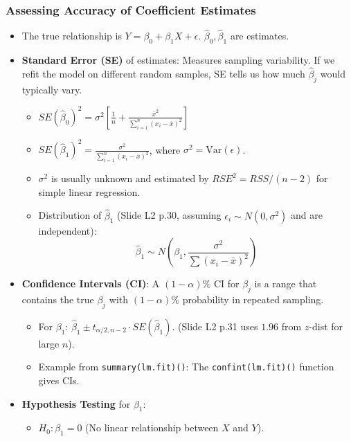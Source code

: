 \documentclass[12pt,a4paper]{article}
\newcommand{\Rfunction}[1]{\texttt{#1()}} %
\begin{document}
\begin{itemize}
    \subsubsection{Assessing Accuracy of Coefficient Estimates }
        \begin{itemize}
            \item The true relationship is $Y = \beta_0 + \beta_1 X + \epsilon$. $\hat{\beta}_0, \hat{\beta}_1$ are estimates.
            \item \textbf{Standard Error (SE)} of estimates: Measures sampling variability. If we refit the model on different random samples, SE tells us how much $\hat{\beta}_j$ would typically vary.
                \begin{itemize}
                    \item $SE(\hat{\beta}_0)^2 = \sigma^2 \left[ \frac{1}{n} + \frac{\bar{x}^2}{\sum_{i=1}^{n}(x_i - \bar{x})^2} \right]$
                    \item $SE(\hat{\beta}_1)^2 = \frac{\sigma^2}{\sum_{i=1}^{n}(x_i - \bar{x})^2}$, where $\sigma^2 = \text{Var}(\epsilon)$.
                    \item $\sigma^2$ is usually unknown and estimated by $RSE^2 = RSS/(n-2)$ for simple linear regression.
                    \item Distribution of $\hat{\beta}_1$ (Slide L2 p.30, assuming $\epsilon_i \sim N(0, \sigma^2)$ and are independent):
                      $$ \hat{\beta}_1 \sim N\left(\beta_1, \frac{\sigma^2}{\sum(x_i - \bar{x})^2}\right) $$
                \end{itemize}
            \item \textbf{Confidence Intervals (CI)}: A $(1-\alpha)\%$ CI for $\beta_j$ is a range that contains the true $\beta_j$ with $(1-\alpha)\%$ probability in repeated sampling.
                \begin{itemize}
                    \item For $\beta_1$: $\hat{\beta}_1 \pm t_{\alpha/2, n-2} \cdot SE(\hat{\beta}_1)$. (Slide L2 p.31 uses $1.96$ from $z$-dist for large $n$).
                    \item Example from \Rfunction{summary(lm.fit)}: The \Rfunction{confint(lm.fit)} function gives CIs.
                \end{itemize}
            \item \textbf{Hypothesis Testing} for $\beta_1$:
                \begin{itemize}
                    \item $H_0: \beta_1 = 0$ (No linear relationship between $X$ and $Y$).

\end{itemize}
\end{itemize}
\end{itemize}
\end{document}

